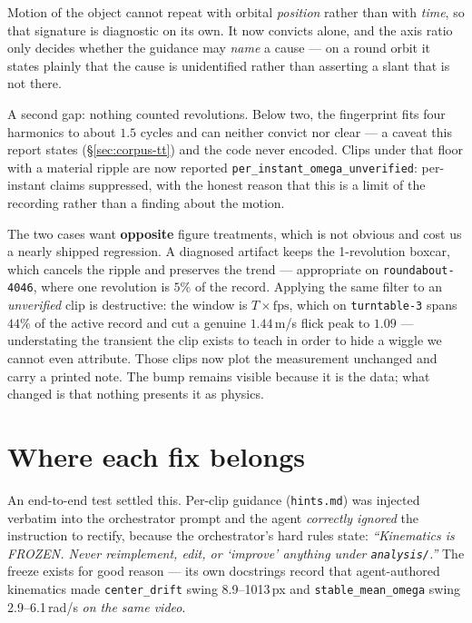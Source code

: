 \documentclass[11pt,a4paper]{article}
\begin{document}
Motion of the object cannot repeat with orbital \emph{position} rather than with \emph{time}, so
that signature is diagnostic on its own. It now convicts alone, and the axis ratio only decides
whether the guidance may \emph{name} a cause --- on a round orbit it states plainly that the cause is
unidentified rather than asserting a slant that is not there.

A second gap: nothing counted revolutions. Below two, the fingerprint fits four harmonics to about
$1.5$ cycles and can neither convict nor clear --- a caveat this report states (\S\ref{sec:corpus-tt})
and the code never encoded. Clips under that floor with a material ripple are now reported
\texttt{per\_instant\_omega\_unverified}: per-instant claims suppressed, with the honest reason that
this is a limit of the recording rather than a finding about the motion.

The two cases want \textbf{opposite} figure treatments, which is not obvious and cost us a nearly
shipped regression. A diagnosed artifact keeps the 1-revolution boxcar, which cancels the ripple and
preserves the trend --- appropriate on \texttt{roundabout-4046}, where one revolution is $5\%$ of the
record. Applying the same filter to an \emph{unverified} clip is destructive: the window is
$T \times \mathrm{fps}$, which on \texttt{turntable-3} spans $44\%$ of the active record and cut a
genuine $1.44$\,m/s flick peak to $1.09$ --- understating the transient the clip exists to teach in
order to hide a wiggle we cannot even attribute. Those clips now plot the measurement unchanged and
carry a printed note. The bump remains visible because it is the data; what changed is that nothing
presents it as physics.

\section{Where each fix belongs}
\label{sec:where}

An end-to-end test settled this. Per-clip guidance (\texttt{hints.md}) was injected verbatim
into the orchestrator prompt and the agent \emph{correctly ignored} the instruction to rectify,
because the orchestrator's hard rules state: \emph{``Kinematics is FROZEN. Never reimplement,
edit, or `improve' anything under \texttt{analysis/}.''} The freeze exists for good reason --- its
own docstrings record that agent-authored kinematics made \texttt{center\_drift} swing
8.9--1013\,px and \texttt{stable\_mean\_omega} swing 2.9--6.1\,rad/s \emph{on the same video}.
\end{document}
